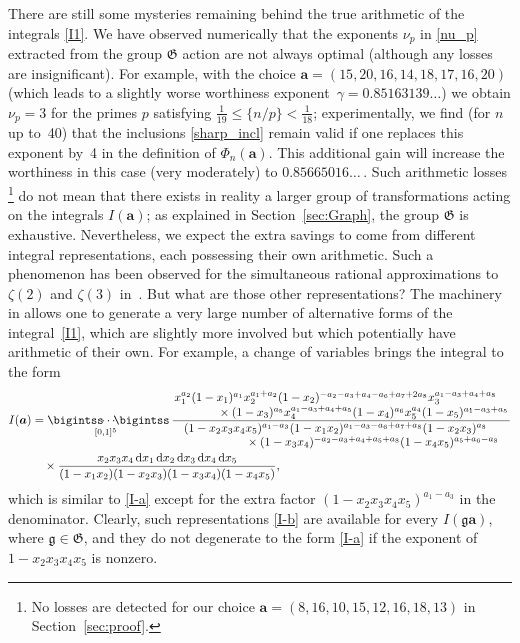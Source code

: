 \documentclass[12pt,reqno]{amsart}
\theoremstyle{remark}
\renewcommand{\d}{{\mathrm d}}
\newcommand\ba{\boldsymbol a}
\newcommand\frG{\mathfrak G}
\newcommand\frg{\mathfrak g}
\begin{document}
There are still some mysteries remaining behind the true arithmetic of the integrals \eqref{I1}.
We have observed numerically that the exponents $\nu_p$ in \eqref{nu_p} extracted from the group $\frG$ action are not always optimal (although any losses  are insignificant).
For example, with the choice $\ba=(15, 20, 16, 14, 18, 17, 16, 20)$ (which leads to a slightly worse worthiness exponent~$\gamma=0.85163139\dots$) we obtain $\nu_p=3$ for the primes $p$ satisfying $\frac1{19} \le \{n/p\} < \frac1{18}$;
experimentally, we find  (for $n$ up to~40) that the inclusions \eqref{sharp_incl} remain valid if one replaces this exponent by~4 in the definition of $\Phi_n(\ba)$. 
This additional gain will increase the worthiness  in this case (very moderately) to $0.85665016\dots$\,.
Such arithmetic losses%
\footnote{No losses are detected for our choice $\ba=(8, 16, 10, 15, 12, 16, 18, 13)$ in Section~\ref{sec:proof}.}
do not  mean that there exists in reality a larger  group of transformations acting on the integrals $I(\ba)$;  as explained in Section~\ref{sec:Graph},  the group $\frG$ is exhaustive. 
Nevertheless, we expect the extra savings to come from different integral representations, each  possessing their own arithmetic.
Such a phenomenon has been observed for the simultaneous rational approximations to $\zeta(2)$ and $\zeta(3)$ in~\cite{Zu14}. But what are those other representations?
The machinery in \cite{Br16} allows one to generate a very large number of alternative  forms of the integral~\eqref{I1}, which are slightly more involved but which potentially have  arithmetic of their own.
For example, a change of variables brings the integral to the form
\begin{align}
I(\ba)
&=\mathop{\bigintss\!\!\dotsb\!\!\bigintss}_{[0,1]^5\;\;}
\frac{\splitfrac{x_1^{a_2}(1-x_1)^{a_1}x_2^{a_1 + a_2}(1-x_2)^{- a_2 - a_3 + a_4 - a_6 + a_7 + 2a_8}x_3^{a_1 - a_3 + a_4 + a_8}}
{\times (1-x_3)^{a_5}x_4^{a_1 - a_3 + a_4 + a_5}(1-x_4)^{a_6}x_5^{a_4}(1-x_5)^{a_1 - a_3 + a_5}}}
{\splitfrac{(1-x_2x_3x_4x_5)^{a_1 - a_3}(1-x_1x_2)^{a_1 - a_3 - a_6 + a_7 + a_8}(1-x_2x_3)^{a_8}}{\times(1-x_3x_4)^{- a_2 - a_3 + a_4 + a_5 + a_8}(1-x_4x_5)^{a_5 + a_6 - a_8}}}
\nonumber\\ &\quad\times
\frac{x_2x_3x_4\,\d x_1\,\d x_2\,\d x_3\,\d x_4\,\d x_5}{(1-x_1x_2)(1-x_2x_3)(1-x_3x_4)(1-x_4x_5)},
\label{I-b}
\end{align}
which is similar to \eqref{I-a} except for the extra factor $(1-x_2x_3x_4x_5)^{a_1 - a_3}$ in the denominator.
Clearly, such representations \eqref{I-b} are available for every $I(\frg\ba)$, where $\frg\in\frG$, and they do not degenerate  to the form \eqref{I-a} if the  exponent of $1-x_2x_3x_4x_5$ is nonzero.
\end{document}
